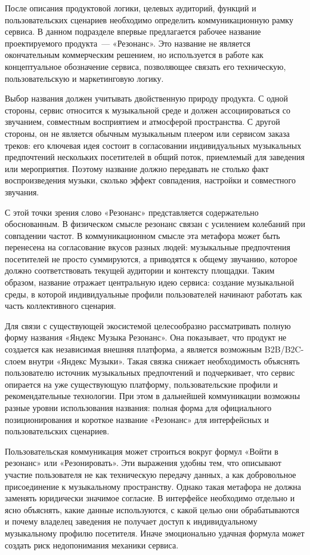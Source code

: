 После описания продуктовой логики, целевых аудиторий, функций и пользовательских сценариев необходимо определить коммуникационную рамку сервиса. В данном подразделе впервые предлагается рабочее название проектируемого продукта~--- «Резонанс». Это название не является окончательным коммерческим решением, но используется в работе как концептуальное обозначение сервиса, позволяющее связать его техническую, пользовательскую и маркетинговую логику.

Выбор названия должен учитывать двойственную природу продукта. С одной стороны, сервис относится к музыкальной среде и должен ассоциироваться со звучанием, совместным восприятием и атмосферой пространства. С другой стороны, он не является обычным музыкальным плеером или сервисом заказа треков: его ключевая идея состоит в согласовании индивидуальных музыкальных предпочтений нескольких посетителей в общий поток, приемлемый для заведения или мероприятия. Поэтому название должно передавать не столько факт воспроизведения музыки, сколько эффект совпадения, настройки и совместного звучания.

С этой точки зрения слово «Резонанс» представляется содержательно обоснованным. В физическом смысле резонанс связан с усилением колебаний при совпадении частот. В коммуникационном смысле эта метафора может быть перенесена на согласование вкусов разных людей: музыкальные предпочтения посетителей не просто суммируются, а приводятся к общему звучанию, которое должно соответствовать текущей аудитории и контексту площадки. Таким образом, название отражает центральную идею сервиса: создание музыкальной среды, в которой индивидуальные профили пользователей начинают работать как часть коллективного сценария.

Для связи с существующей экосистемой целесообразно рассматривать полную форму названия «Яндекс Музыка Резонанс». Она показывает, что продукт не создается как независимая внешняя платформа, а является возможным B2B/B2C-слоем внутри «Яндекс Музыки». Такая связка снижает необходимость объяснять пользователю источник музыкальных предпочтений и подчеркивает, что сервис опирается на уже существующую платформу, пользовательские профили и рекомендательные технологии. При этом в дальнейшей коммуникации возможны разные уровни использования названия: полная форма для официального позиционирования и короткое название «Резонанс» для интерфейсных и пользовательских сценариев.

Пользовательская коммуникация может строиться вокруг формул «Войти в резонанс» или «Резонировать». Эти выражения удобны тем, что описывают участие пользователя не как техническую передачу данных, а как добровольное присоединение к музыкальному пространству. Однако такая метафора не должна заменять юридически значимое согласие. В интерфейсе необходимо отдельно и ясно объяснять, какие данные используются, с какой целью они обрабатываются и почему владелец заведения не получает доступ к индивидуальному музыкальному профилю посетителя. Иначе эмоционально удачная формула может создать риск недопонимания механики сервиса.

